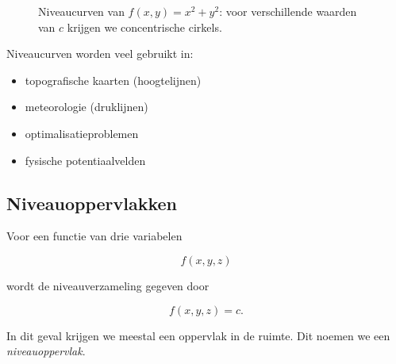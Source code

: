 \documentclass[11pt,a4paper]{article}
\begin{document}
    \begin{figure}[htbp]
        \centering
        \caption{Niveaucurven van $f(x,y)=x^2+y^2$: voor verschillende waarden van $c$ krijgen we concentrische cirkels.}
        \label{fig:niveaucurven-cirkels}
    \end{figure}

    Niveaucurven worden veel gebruikt in:

    \begin{itemize}
        \item topografische kaarten (hoogtelijnen)
        \item meteorologie (druklijnen)
        \item optimalisatieproblemen
        \item fysische potentiaalvelden
    \end{itemize}

    \subsection{Niveauoppervlakken}

    Voor een functie van drie variabelen

    \[
        f(x,y,z)
    \]

    wordt de niveauverzameling gegeven door

    \[
        f(x,y,z) = c.
    \]

    In dit geval krijgen we meestal een oppervlak in de ruimte.
    Dit noemen we een \textit{niveauoppervlak}.
\end{document}

